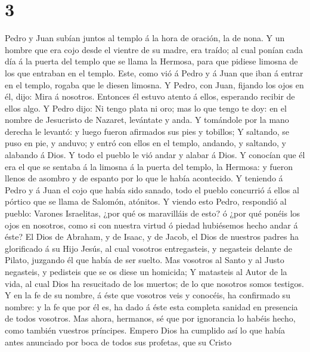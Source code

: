 \hypertarget{section-2}{%
\section{3}\label{section-2}}

 Pedro y Juan subían juntos al templo á la hora de oración,
la de nona.  Y un hombre que era cojo desde el vientre de su
madre, era traído; al cual ponían cada día á la puerta del templo que se
llama la Hermosa, para que pidiese limosna de los que entraban en el
templo.  Este, como vió á Pedro y á Juan que iban á entrar
en el templo, rogaba que le diesen limosna.  Y Pedro, con
Juan, fijando los ojos en él, dijo: Mira á nosotros. 
Entonces él estuvo atento á ellos, esperando recibir de ellos algo.
 Y Pedro dijo: Ni tengo plata ni oro; mas lo que tengo te
doy: en el nombre de Jesucristo de Nazaret, levántate y anda.
 Y tomándole por la mano derecha le levantó: y luego fueron
afirmados sus pies y tobillos;  Y saltando, se puso en pie,
y anduvo; y entró con ellos en el templo, andando, y saltando, y
alabando á Dios.  Y todo el pueblo le vió andar y alabar á
Dios.  Y conocían que él era el que se sentaba á la limosna
á la puerta del templo, la Hermosa: y fueron llenos de asombro y de
espanto por lo que le había acontecido.  Y teniendo á Pedro
y á Juan el cojo que había sido sanado, todo el pueblo concurrió á ellos
al pórtico que se llama de Salomón, atónitos.  Y viendo
esto Pedro, respondió al pueblo: Varones Israelitas, ¿por qué os
maravilláis de esto? ó ¿por qué ponéis los ojos en nosotros, como si con
nuestra virtud ó piedad hubiésemos hecho andar á éste?  El
Dios de Abraham, y de Isaac, y de Jacob, el Dios de nuestros padres ha
glorificado á su Hijo Jesús, al cual vosotros entregasteis, y negasteis
delante de Pilato, juzgando él que había de ser suelto. 
Mas vosotros al Santo y al Justo negasteis, y pedisteis que se os diese
un homicida;  Y matasteis al Autor de la vida, al cual Dios
ha resucitado de los muertos; de lo que nosotros somos testigos.
 Y en la fe de su nombre, á éste que vosotros veis y
conocéis, ha confirmado su nombre: y la fe que por él es, ha dado á éste
esta completa sanidad en presencia de todos vosotros.  Mas
ahora, hermanos, sé que por ignorancia lo habéis hecho, como también
vuestros príncipes.  Empero Dios ha cumplido así lo que
había antes anunciado por boca de todos sus profetas, que su Cristo
